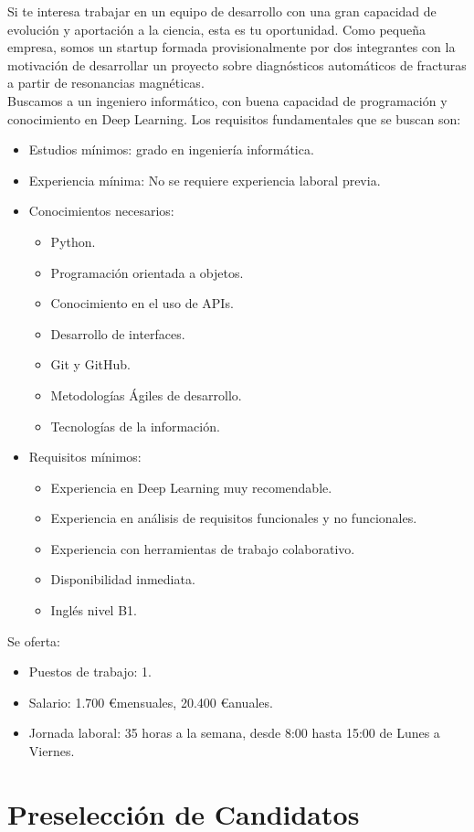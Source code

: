 Si te interesa trabajar en un equipo de desarrollo con una gran capacidad de evolución y aportación a la ciencia, esta es tu oportunidad. Como pequeña empresa, somos un startup formada provisionalmente por dos integrantes con la motivación de desarrollar un proyecto sobre diagnósticos automáticos de fracturas a partir de resonancias magnéticas. \\

Buscamos a un ingeniero informático, con buena capacidad de programación y conocimiento en Deep Learning. Los requisitos fundamentales que se buscan son:

\begin{itemize}
	\item Estudios mínimos: grado en ingeniería informática.
	\item Experiencia mínima: No se requiere experiencia laboral previa.	
	\item Conocimientos necesarios:
		\begin{itemize}
			\item Python.
			\item Programación orientada a objetos.
			\item Conocimiento en el uso de APIs.
			\item Desarrollo de interfaces.
			\item Git y GitHub.
			\item Metodologías Ágiles de desarrollo.
			\item Tecnologías de la información.
		\end{itemize}
	\item Requisitos mínimos:
	\begin{itemize}
		\item Experiencia en Deep Learning muy recomendable.
		\item Experiencia en análisis de requisitos funcionales y no funcionales.
		\item Experiencia con herramientas de trabajo colaborativo.
		\item Disponibilidad inmediata.
		\item Inglés nivel B1.
	\end{itemize}
\end{itemize}

Se oferta:

\begin{itemize}
	\item Puestos de trabajo: 1.
	\item Salario: 1.700 \euro mensuales, 20.400 \euro anuales.
	\item Jornada laboral: 35 horas a la semana, desde 8:00 hasta 15:00 de Lunes a Viernes.
\end{itemize}

\newpage

\section{Preselección de Candidatos}


\newpage



       
